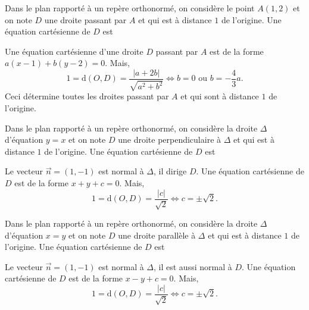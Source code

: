 \begin{question}

Dans le plan rapporté à un repère orthonormé, on considère le point $\displaystyle A(1,2)$ et on note $D$ une droite passant par $A$ et qui est à distance $1$ de l'origine. Une équation cartésienne de $D$ est
\begin{answers}  
\end{answers}
\begin{explanations}
Une équation cartésienne d'une droite $D$ passant par $A$ est de la forme $a(x-1)+b(y-2)=0$. Mais,
$$1=\mbox{d}(O,D)=\frac{|a+2b|}{\sqrt{a^2+b^2}}\Leftrightarrow b=0\mbox{ ou }b=-\frac{4}{3}a.$$
Ceci détermine toutes les droites passant par $A$ et qui sont à distance $1$ de l'origine.
\end{explanations}
\end{question}


\begin{question}

Dans le plan rapporté à un repère orthonormé, on considère la droite $\Delta$ d'équation $y=x$ et on note $D$ une droite perpendiculaire à $\Delta$ et qui est à distance $1$ de l'origine. Une équation cartésienne de $D$ est
\begin{answers}  
\end{answers}
\begin{explanations}
Le vecteur $\vec{n}=(1,-1)$ est normal à $\Delta$, il dirige $D$. Une équation cartésienne de $D$ est de la forme $x+y+c=0$. Mais,
$$1=\mbox{d}(O,D)=\frac{|c|}{\sqrt{2}}\Leftrightarrow c=\pm \sqrt{2}.$$
\end{explanations}
\end{question}


\begin{question}

Dans le plan rapporté à un repère orthonormé, on considère la droite $\Delta$ d'équation $x=y$ et on note $D$ une droite parallèle à $\Delta$ et qui est à distance $1$ de l'origine. Une équation cartésienne de $D$ est
\begin{answers}  
\end{answers}
\begin{explanations}
Le vecteur $\vec{n}=(1,-1)$ est normal à $\Delta$, il est aussi normal à $D$. Une équation cartésienne de $D$ est de la forme $x-y+c=0$. Mais,
$$1=\mbox{d}(O,D)=\frac{|c|}{\sqrt{2}}\Leftrightarrow c=\pm \sqrt{2}.$$
\end{explanations}
\end{question}



